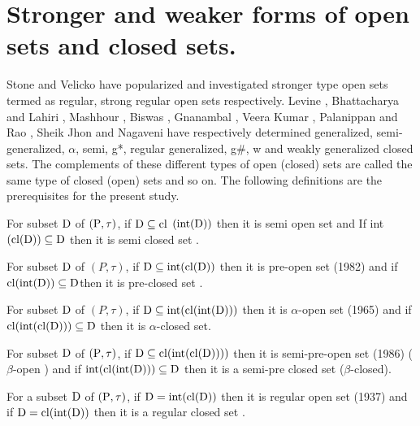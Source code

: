 \section{Stronger and weaker forms of open sets and closed sets.}

Stone \cite{Stone} and Velicko \cite{Velicko} have popularized and investigated stronger type open sets termed as regular, strong regular open sets respectively. Levine \cite{Levine}, Bhattacharya and Lahiri \cite{Bhattacharya}, Mashhour \cite{abd}, Biswas \cite{Biswas}, Gnanambal \cite{Gnanambal}, Veera Kumar \cite{Veerakumar}, Palanippan and Rao \cite{Palaniappan}, Sheik Jhon \cite{Sheik} and Nagaveni \cite{Nagaveni} have respectively determined generalized, semi-generalized, $\alpha$, semi, g*, regular generalized, g\#, w and weakly generalized closed sets. The complements of these different types of open (closed) sets are called the same type of closed (open) sets and so on. The following definitions are the prerequisites for the present study.

\begin{dfn}\label{dfn1.2.1}
For subset $\mathrm{D}$ of $(\mathrm{P}, \tau)$, if $\mathrm{D} \subseteq \mathrm{cl}$ $(\mbox{int} (\mathrm{D}))$ then it is semi open set and If int $(\mathrm{cl}(\mathrm{D})) \subseteq \mathrm{D}$ then it is semi closed set \cite{Levine1}.
\end{dfn}

\begin{dfn}\label{dfn1.2.2}
For subset $\mathrm{D}$ of $(P, \tau)$, if $\mathrm{D} \subseteq \mbox{int}(\mathrm{cl}(\mathrm{D}))$ then it is pre-open set (1982) and if $\mathrm{cl}(\mbox{int}(\mathrm{D})) \subseteq \mathrm{D}$then it is pre-closed set \cite{Arya1}. 
\end{dfn}

\begin{dfn}\label{dfn1.2.3}
For subset $\mathrm{D}$ of $(P, \tau)$, if $\mathrm{D} \subseteq\mbox{int} (\mathrm{cl}(\mbox{int}(\mathrm{D})))$ then it is $\alpha$-open set \cite{Njastad} (1965) and if $\mathrm{cl}(\mbox{int}(\mathrm{cl}(\mathrm{D})))\subseteq \mathrm{D}$ then it is $\alpha$-closed set.
\end{dfn}

\begin{dfn}\label{dfn1.2.4}
For subset $\mathrm{D}$ of $(\mathrm{P}, \tau)$, if $\mathrm{D} \subseteq \mathrm{cl}(\mbox{int}(\mathrm{cl}(\mathrm{D}))))$ then it is semi-pre-open set (1986) ($\beta$-open \cite{abd}) and if $\mbox{int}(\mathrm{cl}(\mbox{int}(\mathrm{D}))) \subseteq \mathrm{D}$ then it is a semi-pre closed set ($\beta$-closed). 
\end{dfn}

\begin{dfn}\label{dfn1.2.5}
For a subset $\mathrm{D}$ of $(\mathrm{P}, \tau)$, if $\mathrm{D} = \mbox{int} (\mathrm{cl}(\mathrm{D}))$ then it is regular open set (1937) and if $\mathrm{D} = \mathrm{cl}(\mbox{int}(\mathrm{D}))$ then it is a regular closed set \cite{Long}.
\end{dfn}

